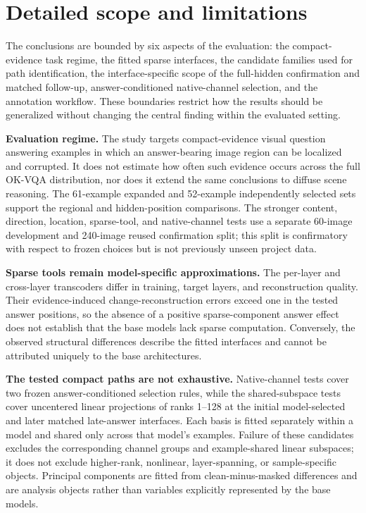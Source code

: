 \section{Detailed scope and limitations}
\label{app:detailed-limitations}

The conclusions are bounded by six aspects of the evaluation: the compact-evidence task regime, the fitted sparse interfaces, the candidate families used for path identification, the interface-specific scope of the full-hidden confirmation and matched follow-up, answer-conditioned native-channel selection, and the annotation workflow. These boundaries restrict how the results should be generalized without changing the central finding within the evaluated setting.

\textbf{Evaluation regime.} The study targets compact-evidence visual question answering examples in which an answer-bearing image region can be localized and corrupted. It does not estimate how often such evidence occurs across the full OK-VQA distribution, nor does it extend the same conclusions to diffuse scene reasoning. The 61-example expanded and 52-example independently selected sets support the regional and hidden-position comparisons. The stronger content, direction, location, sparse-tool, and native-channel tests use a separate 60-image development and 240-image reused confirmation split; this split is confirmatory with respect to frozen choices but is not previously unseen project data.

\textbf{Sparse tools remain model-specific approximations.} The per-layer and cross-layer transcoders differ in training, target layers, and reconstruction quality. Their evidence-induced change-reconstruction errors exceed one in the tested answer positions, so the absence of a positive sparse-component answer effect does not establish that the base models lack sparse computation. Conversely, the observed structural differences describe the fitted interfaces and cannot be attributed uniquely to the base architectures.

\textbf{The tested compact paths are not exhaustive.} Native-channel tests cover two frozen answer-conditioned selection rules, while the shared-subspace tests cover uncentered linear projections of ranks 1--128 at the initial model-selected and later matched late-answer interfaces. Each basis is fitted separately within a model and shared only across that model's examples. Failure of these candidates excludes the corresponding channel groups and example-shared linear subspaces; it does not exclude higher-rank, nonlinear, layer-spanning, or sample-specific objects. Principal components are fitted from clean-minus-masked differences and are analysis objects rather than variables explicitly represented by the base models.

